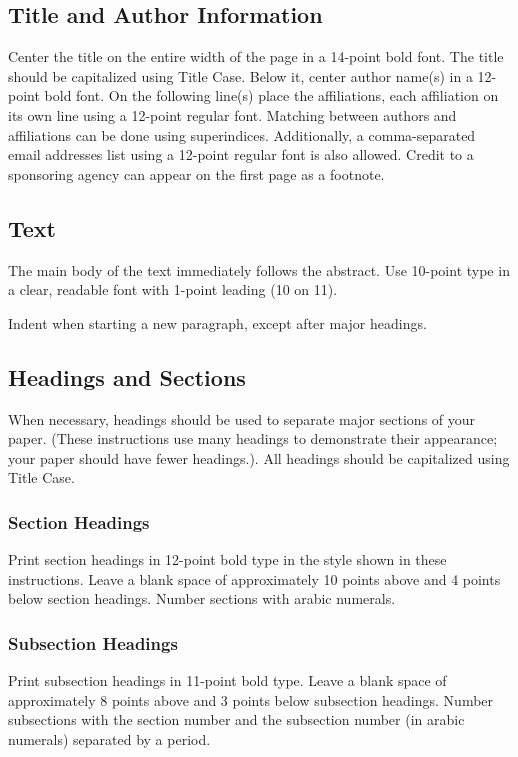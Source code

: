 \documentclass{article}
\begin{document}
\subsection{Title and Author Information}

Center the title on the entire width of the page in a 14-point bold
font. The title should be capitalized using Title Case. Below it, center author name(s) in a 12-point bold font. On the following line(s) place the affiliations, each affiliation on its own line using a 12-point regular font. Matching between authors and affiliations can be done using superindices. Additionally, a comma-separated email addresses list using a 12-point regular font is also allowed. Credit to a
sponsoring agency can appear on the first page as a footnote.

\subsection{Text}

The main body of the text immediately follows the abstract. Use
10-point type in a clear, readable font with 1-point leading (10 on
11).

Indent when starting a new paragraph, except after major headings.

\subsection{Headings and Sections}

When necessary, headings should be used to separate major sections of
your paper. (These instructions use many headings to demonstrate their
appearance; your paper should have fewer headings.). All headings should be capitalized using Title Case.

\subsubsection{Section Headings}

Print section headings in 12-point bold type in the style shown in
these instructions. Leave a blank space of approximately 10 points
above and 4 points below section headings.  Number sections with
arabic numerals.

\subsubsection{Subsection Headings}

Print subsection headings in 11-point bold type. Leave a blank space
of approximately 8 points above and 3 points below subsection
headings. Number subsections with the section number and the
subsection number (in arabic numerals) separated by a
period.
\end{document}

